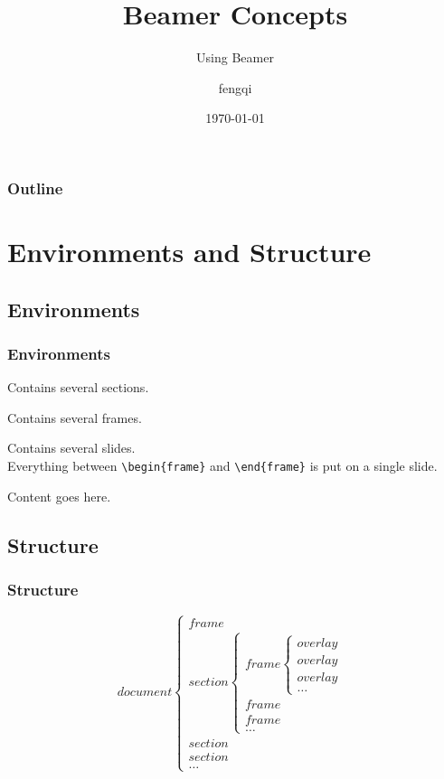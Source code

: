 \documentclass{beamer}
\title{Beamer Concepts}
\subtitle{Using Beamer}
\author{fengqi}
\institute{No institute}
\date{\today}
\begin{document}
\begin{frame}
  \titlepage
\end{frame}

\begin{frame}
  \label{outline}
  \frametitle{Outline}
  \tableofcontents[pausesections]
\end{frame}

\section{Environments and Structure}

\subsection{Environments}
\begin{frame}
  \frametitle{Environments}
  \begin{description}[aligh=left]
  \item [document] {Contains several sections.}
  \item [section] {Contains several frames.}
  \item [frame] {Contains several slides. \\
      Everything between \texttt{\textbackslash begin\{frame\}} and
      \texttt{\textbackslash end\{frame\}} is put on a single slide.}
  \item [overlay(slide)] {Content goes here.}
  \end{description}
\end{frame}

\subsection{Structure}
\begin{frame}
  \frametitle{Structure}
  \noindent
  \[ document
    \begin{cases}
      frame \\
      section
      \begin{cases}
        frame
        \begin{cases}
          overlay \\
          overlay \\
          overlay \\
          \dots
        \end{cases} \\
        frame \\
        frame \\
        \dots
      \end{cases} \\
      section \\
      section \\
      \dots
    \end{cases}
  \]
\end{frame}
\end{document}
